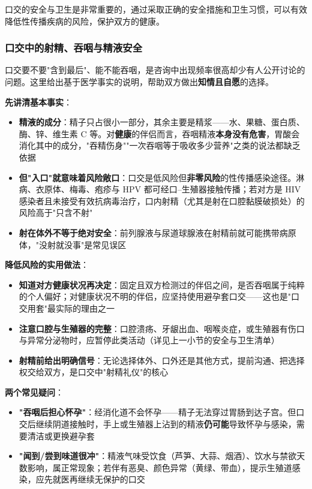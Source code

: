 \documentclass[12pt,UTF8]{ctexbook}
\begin{document}
口交的安全与卫生是非常重要的，通过采取正确的安全措施和卫生习惯，可以有效降低性传播疾病的风险，保护双方的健康。

\subsubsection{口交中的射精、吞咽与精液安全}

口交要不要"含到最后"、能不能吞咽，是咨询中出现频率很高却少有人公开讨论的问题。这里给出基于医学事实的说明，帮助双方做出\textbf{知情且自愿}的选择。

\vspace{0.5em}
\noindent\textbf{先讲清基本事实}：

\begin{itemize}
	\item \textbf{精液的成分}：精子只占很小一部分，其余主要是精浆——水、果糖、蛋白质、酶、锌、维生素 C 等。对\textbf{健康}的伴侣而言，吞咽精液\textbf{本身没有危害}，胃酸会消化其中的成分，"吞精伤身""一次吞咽等于吸收多少营养"之类的说法都缺乏依据
	\item \textbf{但"入口"就意味着风险敞口}：口交是低风险但\textbf{非零风险}的性传播感染途径。淋病、衣原体、梅毒、疱疹与 HPV 都可经口--生殖器接触传播；若对方是 HIV 感染者且未接受有效抗病毒治疗，口内射精（尤其是射在口腔黏膜破损处）的风险高于"只含不射"
	\item \textbf{射在体外不等于绝对安全}：前列腺液与尿道球腺液在射精前就可能携带病原体，"没射就没事"是常见误区
\end{itemize}

\vspace{0.5em}
\noindent\textbf{降低风险的实用做法}：

\begin{itemize}
	\item \textbf{知道对方健康状况再决定}：固定且双方检测过的伴侣之间，是否吞咽属于纯粹的个人偏好；对健康状况不明的伴侣，应坚持使用避孕套口交——这也是"口交用套"最实际的理由之一
	\item \textbf{注意口腔与生殖器的完整}：口腔溃疡、牙龈出血、咽喉炎症，或生殖器有伤口与异常分泌物时，应暂停此类活动（详见上一小节的安全与卫生清单）
	\item \textbf{射精前给出明确信号}：无论选择体外、口外还是其他方式，提前沟通、把选择权交给双方，是口交中"射精礼仪"的核心
\end{itemize}

\vspace{0.5em}
\noindent\textbf{两个常见疑问}：

\begin{itemize}
	\item \textbf{"吞咽后担心怀孕"}：经消化道不会怀孕——精子无法穿过胃肠到达子宫。但口交后继续阴道接触时，手上或生殖器上沾到的精液\textbf{仍可能}导致怀孕与感染，需要清洁或更换避孕套
	\item \textbf{"闻到/尝到味道很冲"}：精液气味受饮食（芦笋、大蒜、烟酒）、饮水与禁欲天数影响，属正常现象；若伴有恶臭、颜色异常（黄绿、带血），提示生殖道感染，应先就医再继续无保护的口交
\end{itemize}
\end{document}
